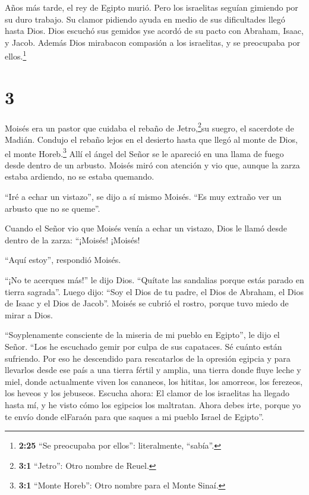  Años más tarde, el rey de Egipto murió. Pero los
israelitas seguían gimiendo por su duro trabajo. Su clamor pidiendo
ayuda en medio de sus dificultades llegó hasta Dios.  Dios
escuchó sus gemidos yse acordó de su pacto con Abraham, Isaac, y Jacob.
 Además Dios mirabacon compasión a los israelitas, y se
preocupaba por ellos.\footnote{\textbf{2:25} ``Se preocupaba por
  ellos'': literalmente, ``sabía''.}

\hypertarget{section-2}{%
\section{3}\label{section-2}}

 Moisés era un pastor que cuidaba el rebaño de
Jetro,\footnote{\textbf{3:1} ``Jetro'': Otro nombre de Reuel.}su suegro,
el sacerdote de Madián. Condujo el rebaño lejos en el desierto hasta que
llegó al monte de Dios, el monte Horeb.\footnote{\textbf{3:1} ``Monte
  Horeb'': Otro nombre para el Monte Sinaí.}  Allí el ángel
del Señor se le apareció en una llama de fuego desde dentro de un
arbusto. Moisés miró con atención y vio que, aunque la zarza estaba
ardiendo, no se estaba quemando.

 ``Iré a echar un vistazo'', se dijo a sí mismo Moisés. ``Es
muy extraño ver un arbusto que no se queme''.

 Cuando el Señor vio que Moisés venía a echar un vistazo,
Dios le llamó desde dentro de la zarza: ``¡Moisés! ¡Moisés!

``Aquí estoy'', respondió Moisés.

 ``¡No te acerques más!'' le dijo Dios. ``Quítate las
sandalias porque estás parado en tierra sagrada''.  Luego
dijo: ``Soy el Dios de tu padre, el Dios de Abraham, el Dios de Isaac y
el Dios de Jacob''. Moisés se cubrió el rostro, porque tuvo miedo de
mirar a Dios.

 ``Soyplenamente consciente de la miseria de mi pueblo en
Egipto'', le dijo el Señor. ``Los he escuchado gemir por culpa de sus
capataces. Sé cuánto están sufriendo.  Por eso he descendido
para rescatarlos de la opresión egipcia y para llevarlos desde ese país
a una tierra fértil y amplia, una tierra donde fluye leche y miel, donde
actualmente viven los cananeos, los hititas, los amorreos, los ferezeos,
los heveos y los jebuseos.  Escucha ahora: El clamor de los
israelitas ha llegado hasta mí, y he visto cómo los egipcios los
maltratan.  Ahora debes irte, porque yo te envío donde
elFaraón para que saques a mi pueblo Israel de Egipto''.


